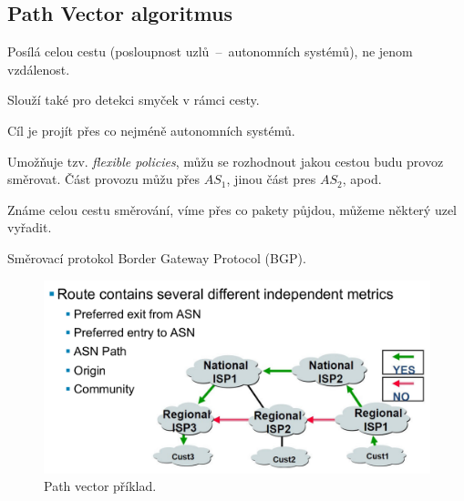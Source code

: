 \subsection*{Path Vector algoritmus}

\begin{compactitem}
    \item Posílá celou cestu (posloupnost uzlů~--~autonomních systémů), ne jenom vzdálenost.
    \item Slouží také pro detekci smyček v rámci cesty.
    \item Cíl je projít přes co nejméně autonomních systémů.
    \item Umožňuje tzv. \textit{flexible policies}, můžu se rozhodnout jakou cestou budu provoz směrovat. Část provozu můžu přes $AS_1$, jinou část pres $AS_2$, apod.
    \item Známe celou cestu směrování, víme přes co pakety půjdou, můžeme některý uzel vyřadit.
    \item Směrovací protokol Border Gateway Protocol (BGP).
\end{compactitem}

\begin{figure}[H]
    \centering
    \includegraphics[width=0.75\linewidth]{path_vector.pdf}
    \caption{Path vector příklad.}
\end{figure}

